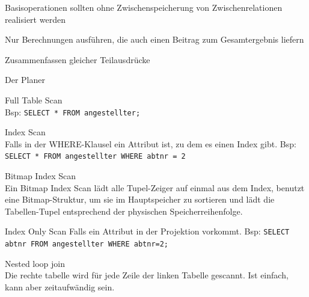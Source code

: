 \documentclass[10pt,landscape,a4paper]{scrartcl}
\begin{document}
\begin{multicols*}{5}
\begin{compactitem} [$\bullet$]
	\item Basisoperationen sollten ohne Zwischenspeicherung von Zwischenrelationen realisiert werden
	\item Nur Berechnungen ausführen, die auch einen Beitrag zum Gesamtergebnis liefern
	\item Zusammenfassen gleicher Teilausdrücke
\end{compactitem}
\textcolor{b}{Der Planer}
\begin{compactitem} [$\bullet$]
	\item \textcolor{b}{Full Table Scan}\\
	Bsp: \texttt{SELECT * FROM angestellter;}
	\item \textcolor{b}{Index Scan}\\
	Falls in der WHERE-Klausel ein Attribut ist, zu dem es einen Index gibt. Bsp: \texttt{SELECT * FROM angestellter WHERE abtnr = 2}
	\item \textcolor{b}{Bitmap Index Scan}\\
	Ein Bitmap Index Scan lädt alle Tupel-Zeiger auf einmal aus dem Index, benutzt eine Bitmap-Struktur, um sie im Hauptspeicher zu sortieren und lädt die Tabellen-Tupel entsprechend der physischen Speicherreihenfolge.
	\item \textcolor{b}{Index Only Scan}
	Falls ein Attribut in der Projektion vorkommt. Bsp: \texttt{SELECT abtnr FROM angestellter WHERE abtnr=2;}
	\item \textcolor{b}{Nested loop join}\\
	Die rechte tabelle wird für jede Zeile der linken Tabelle gescannt. Ist einfach, kann aber zeitaufwändig sein.
\end{compactitem}
	\end{multicols*}
\end{document}
